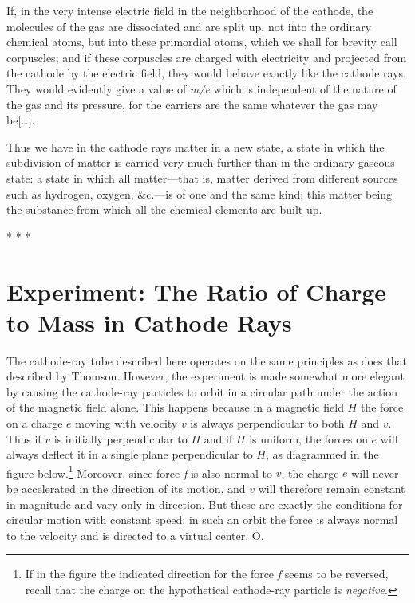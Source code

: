 If, in the very intense electric field in the neighborhood of the
cathode, the molecules of the gas are dissociated and are split up, not
into the ordinary chemical atoms, but into these primordial atoms, which
we shall for brevity call corpuscles; and if these corpuscles are
charged with electricity and projected from the cathode by the electric
field, they would behave exactly like the cathode rays. They would
evidently give a value of \emph{m/e} which is independent of the nature
of the gas and its pressure, for the carriers are the same whatever the
gas may be[\ldots].

Thus we have in the cathode rays matter in a new state, a state in which
the sub\-di\-vi\-sion of matter is carried very much further than in the
ordinary gaseous state: a state in which all matter---that is, matter
derived from different sources such as hydrogen, oxygen, \&c.---is of
one and the same kind; this matter being the substance from which all
the chemical elements are built up.\\
\centerline{* * *}
%
\section*{Experiment: The Ratio of Charge to Mass in Cathode Rays}

The cathode-ray tube de\-scribed here operates on the same principles as
does that de\-scribed by Thomson. However, the experiment is made somewhat
more elegant by causing the cathode-ray particles to orbit in a circular
path under the action of the magnetic field alone. This happens because
in a magnetic field $H$ the force on a charge $e$ moving with
velocity $v$ is always per\-pen\-dic\-u\-lar to both $H$ and $v$.
Thus if $v$ is initially per\-pen\-dic\-u\-lar to $H$ and if $H$
is uniform, the forces on $e$ will always deflect it in a single
plane per\-pen\-dic\-u\-lar to $H$, as diagrammed in the figure
below.\footnote{If in the figure the indicated direction for the force
  \emph{f} seems to be reversed, recall that the charge on the
  hypothetical cathode-ray particle is \emph{negative}.} Moreover, since
force \emph{f} is also normal to $v$, the charge $e$ will
never be accelerated in the direction of its motion, and $v$ will
therefore remain constant in magnitude and vary only in direction. But
these are exactly the conditions for circular motion with constant
speed; in such an orbit the force is always normal to the velocity and
is directed to a virtual center, O.


